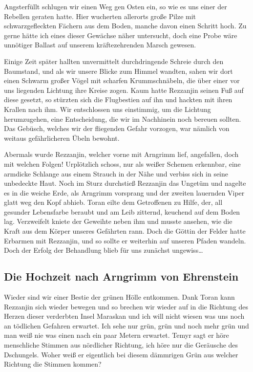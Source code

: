 Angsterfüllt schlugen wir einen Weg gen Osten ein, so wie es uns einer der Rebellen geraten hatte. Hier wucherten allerorts große Pilze mit schwarzgefleckten Fächern aus dem Boden, manche davon einen Schritt hoch. Zu gerne hätte ich eines dieser Gewächse näher untersucht, doch eine Probe wäre unnötiger Ballast auf unserem kräftezehrenden Marsch gewesen. 

Einige Zeit später hallten unvermittelt durchdringende Schreie durch den Baumstand, und als wir unsere Blicke zum Himmel wandten, sahen wir dort einen Schwarm großer Vögel mit scharfen Krummschnäbeln, die über einer vor uns liegenden Lichtung ihre Kreise zogen. Kaum hatte Rezzanjin seinen Fuß auf diese gesetzt, so stürzten sich die Flugbestien auf ihn und hackten mit ihren Krallen nach ihm. Wir entschlossen uns einstimmig, um die Lichtung herumzugehen, eine Entscheidung, die wir im Nachhinein noch bereuen sollten. Das Gebüsch, welches wir der fliegenden Gefahr vorzogen, war nämlich von weitaus gefährlicheren Übeln bewohnt. 

Abermals wurde Rezzanjin, welcher vorne mit Arngrimm lief, angefallen, doch mit welchen Folgen! Urplötzlich schoss, nur als weißer Schemen erkennbar, eine armdicke Schlange aus einem Strauch in der Nähe und verbiss sich in seine unbedeckte Haut. Noch im Sturz durchstieß Rezzanjin das Ungetüm und nagelte es in die weiche Erde, als Arngrimm vorsprang und der zweiten lauernden Viper glatt weg den Kopf abhieb. Toran eilte dem Getroffenen zu Hilfe, der, all gesunder Lebensfarbe beraubt und am Leib zitternd, keuchend auf dem Boden lag. Verzweifelt kniete der Geweihte neben ihm und musste ansehen, wie die Kraft aus dem Körper unseres Gefährten rann. Doch die Göttin der Felder hatte Erbarmen mit Rezzanjin, und so sollte er weiterhin auf unseren Pfaden wandeln. Doch der Erfolg der Behandlung blieb für uns zunächst ungewiss\dots

\subsection{Die Hochzeit nach Arngrimm von Ehrenstein}

Wieder sind wir einer Bestie der grünen Hölle entkommen. Dank Toran kann Rezzanjin sich wieder bewegen und so brechen wir wieder auf in die Richtung des Herzen dieser verderbten Insel Maraskan und ich will nicht wiesen was uns noch an tödlichen Gefahren erwartet. Ich sehe nur grün, grün und noch mehr grün und man weiß nie was einen nach ein paar Metern erwartet. 
Temyr sagt er höre menschliche Stimmen aus nördlicher Richtung, ich höre nur die Geräusche des Dschungels. Woher weiß er eigentlich bei diesem dämmrigen Grün aus welcher Richtung die Stimmen kommen?

